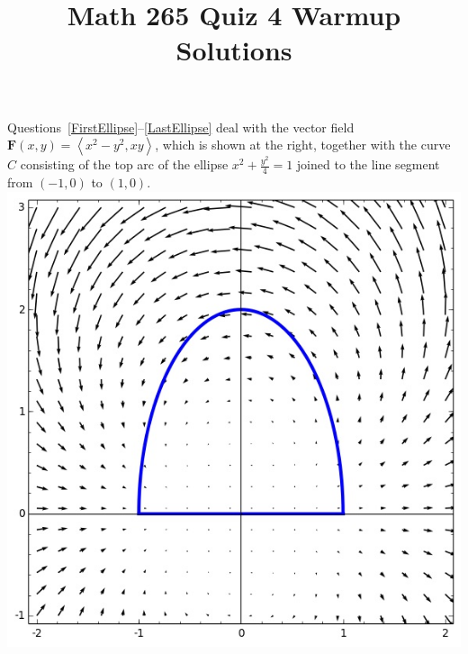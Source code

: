 \documentclass[12pt]{article}
\title{Math 265 Quiz 4 Warmup Solutions}\author{}\date{}
\begin{document}
\maketitle
\thispagestyle{empty}
\begin{multicols}{2}
Questions~\ref{FirstEllipse}--\ref{LastEllipse}
deal with the vector field $\mathbold{F}\left(x,y\right)
=\left\langle x^2-y^2,xy\right\rangle$, which is shown
at the right, together with the curve $C$ consisting of
the top arc of the ellipse $x^2+\frac{y^2}{4}=1$
joined to the line segment from $\left(-1,0\right)$
to $\left(1,0\right)$.
\includegraphics[scale=.4]{Ellipse}
\end{multicols}
\end{document}

